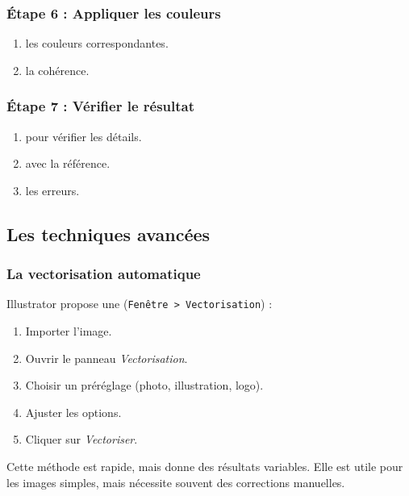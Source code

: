 \subsubsection{Étape 6 : Appliquer les couleurs}

\begin{enumerate}
    \item {} les couleurs correspondantes.
    \item {} la cohérence.
\end{enumerate}

\subsubsection{Étape 7 : Vérifier le résultat}

\begin{enumerate}
    \item {} pour vérifier les détails.
    \item {} avec la référence.
    \item {} les erreurs.
\end{enumerate}

\subsection{Les techniques avancées}

\subsubsection{La vectorisation automatique}

Illustrator propose une  (\texttt{Fenêtre > Vectorisation}) :

\begin{enumerate}
    \item Importer l'image.
    \item Ouvrir le panneau \emph{Vectorisation}.
    \item Choisir un préréglage (photo, illustration, logo).
    \item Ajuster les options.
    \item Cliquer sur \emph{Vectoriser}.
\end{enumerate}

Cette méthode est rapide, mais donne des résultats variables. Elle est utile pour les images simples, mais nécessite souvent des corrections manuelles.

